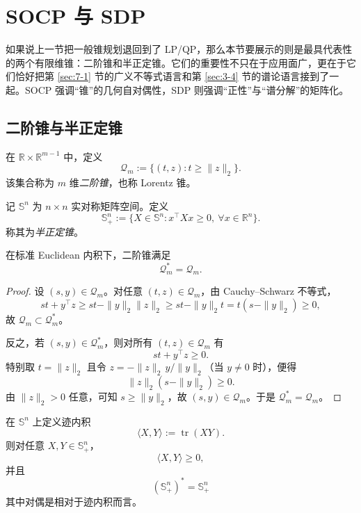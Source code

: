 \section{SOCP 与 SDP}

\label{sec:8-3}

如果说上一节把一般锥规划退回到了 LP/QP，那么本节要展示的则是最具代表性的两个有限维锥：二阶锥和半正定锥。它们的重要性不只在于应用面广，更在于它们恰好把第 \ref{sec:7-1} 节的广义不等式语言和第 \ref{sec:3-4} 节的谱论语言接到了一起。SOCP 强调“锥”的几何自对偶性，SDP 则强调“正性”与“谱分解”的矩阵化。

\subsection{二阶锥与半正定锥}

\begin{definition}[二阶锥]\label{def:second-order-cone}
在 $\mathbb R\times \mathbb R^{m-1}$ 中，定义
\[
\mathcal Q_m:=\{(t,z):t\ge \|z\|_2\}.
\]
该集合称为 $m$ 维\emph{二阶锥}，也称 Lorentz 锥。
\end{definition}

\begin{definition}[半正定锥]\label{def:positive-semidefinite-cone}
记 $\mathbb S^n$ 为 $n\times n$ 实对称矩阵空间。定义
\[
\mathbb S_+^n:=\{X\in \mathbb S^n:x^\top Xx\ge 0,\ \forall x\in \mathbb R^n\}.
\]
称其为\emph{半正定锥}。
\end{definition}

\begin{proposition}[二阶锥的自对偶性]\label{prop:soc-self-dual}
在标准 Euclidean 内积下，二阶锥满足
\[
\mathcal Q_m^\ast=\mathcal Q_m.
\]
\end{proposition}

\begin{proof}
设 $(s,y)\in \mathcal Q_m$。对任意 $(t,z)\in \mathcal Q_m$，由 Cauchy--Schwarz 不等式，
\[
s t+y^\top z\ge st-\|y\|_2\|z\|_2\ge st-\|y\|_2 t=t(s-\|y\|_2)\ge 0,
\]
故 $\mathcal Q_m\subset \mathcal Q_m^\ast$。

反之，若 $(s,y)\in \mathcal Q_m^\ast$，则对所有 $(t,z)\in \mathcal Q_m$ 有
\[
st+y^\top z\ge 0.
\]
特别取 $t=\|z\|_2$ 且令 $z=-\|z\|_2\,y/\|y\|_2$（当 $y\neq 0$ 时），便得
\[
\|z\|_2(s-\|y\|_2)\ge 0.
\]
由 $\|z\|_2>0$ 任意，可知 $s\ge \|y\|_2$，故 $(s,y)\in \mathcal Q_m$。于是 $\mathcal Q_m^\ast=\mathcal Q_m$。
\end{proof}

\begin{proposition}[迹内积与半正定锥的对偶配对]\label{prop:trace-inner-product-duality}
在 $\mathbb S^n$ 上定义迹内积
\[
\langle X,Y\rangle:=\operatorname{tr}(XY).
\]
则对任意 $X,Y\in \mathbb S_+^n$，
\[
\langle X,Y\rangle\ge 0,
\]
并且
\[
(\mathbb S_+^n)^\ast=\mathbb S_+^n
\]
其中对偶是相对于迹内积而言。
\end{proposition}

